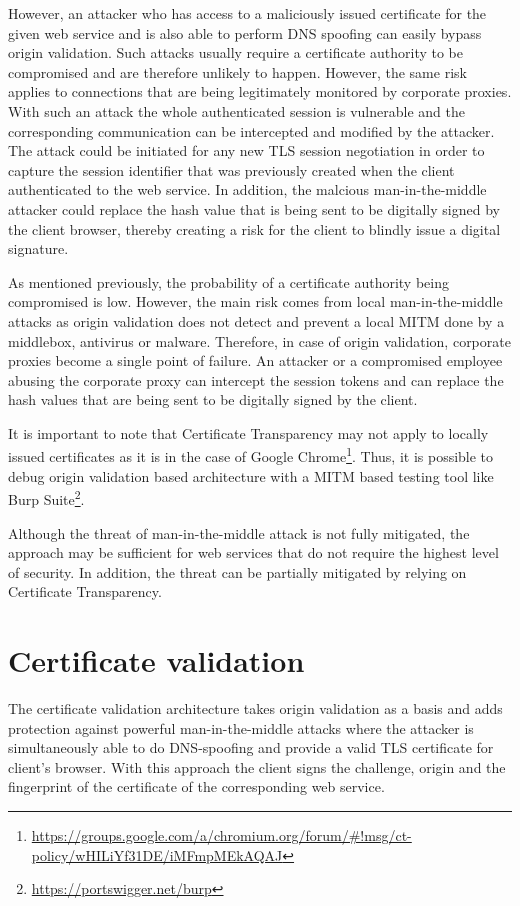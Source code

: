 However, an attacker who has access to a maliciously issued certificate for the given web service and is also able to perform DNS spoofing can easily bypass origin validation. Such attacks usually require a certificate authority to be compromised and are therefore unlikely to happen. However, the same risk applies to connections that are being legitimately monitored by corporate proxies. With such an attack the whole authenticated session is vulnerable and the corresponding communication can be intercepted and modified by the attacker. The attack could be initiated for any new TLS session negotiation in order to capture the session identifier that was previously created when the client authenticated to the web service. In addition, the malcious man-in-the-middle attacker could replace the hash value that is being sent to be digitally signed by the client browser, thereby creating a risk for the client to blindly issue a digital signature.

As mentioned previously, the probability of a certificate authority being compromised is low. However, the main risk comes from local man-in-the-middle attacks as origin validation does not detect and prevent a local MITM done by a middlebox, antivirus or malware. Therefore, in case of origin validation, corporate proxies become a single point of failure. An attacker or a compromised employee abusing the corporate proxy can intercept the session tokens and can replace the hash values that are being sent to be digitally signed by the client. 

It is important to note that Certificate Transparency may not apply to locally issued certificates as it is in the case of Google Chrome\footnote{\url{https://groups.google.com/a/chromium.org/forum/\#!msg/ct-policy/wHILiYf31DE/iMFmpMEkAQAJ}}. Thus, it is possible to debug origin validation based architecture with a MITM based testing tool like Burp Suite\footnote{\url{https://portswigger.net/burp}}.

Although the threat of man-in-the-middle attack is not fully mitigated, the approach may be sufficient for web services that do not require the highest level of security. In addition, the threat can be partially mitigated by relying on Certificate Transparency.


\section{Certificate validation}
\label{sec:cert_validation}
The certificate validation architecture takes origin validation as a basis and adds protection against powerful man-in-the-middle attacks where the attacker is simultaneously able to do DNS-spoofing and provide a valid TLS certificate for client's browser. With this approach the client signs the challenge, origin and the fingerprint of the certificate of the corresponding web service.

